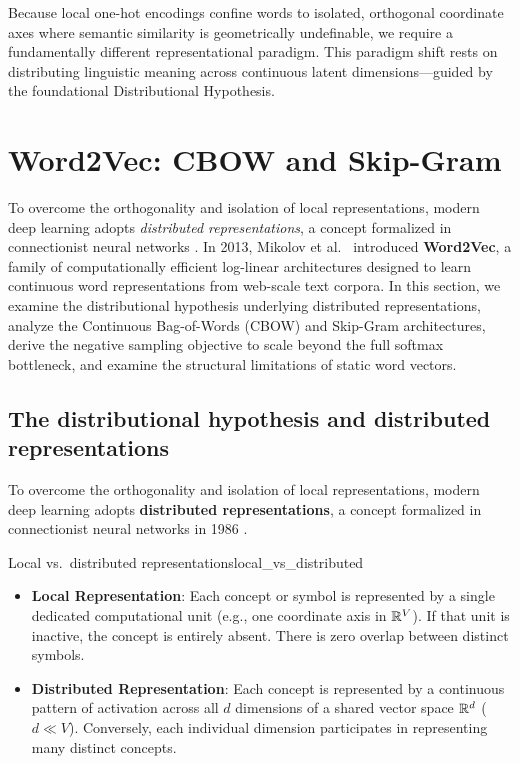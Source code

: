 \documentclass[../../main.tex]{subfiles}
\begin{document}
Because local one-hot encodings confine words to isolated, orthogonal coordinate axes where semantic similarity is geometrically undefinable, we require a fundamentally different representational paradigm. This paradigm shift rests on distributing linguistic meaning across continuous latent dimensions---guided by the foundational Distributional Hypothesis.

\clearpage

\clearpage
\section{Word2Vec: CBOW and Skip-Gram}
\label{sec:word2vec_cbow_skipgram}

To overcome the orthogonality and isolation of local representations, modern deep learning adopts \textit{distributed representations}, a concept formalized in connectionist neural networks \citep{rumelhart1986}. In 2013, Mikolov et al.~\citep{mikolov2013efficient,mikolov2013distributed} introduced \textbf{Word2Vec}, a family of computationally efficient log-linear architectures designed to learn continuous word representations from web-scale text corpora. In this section, we examine the distributional hypothesis underlying distributed representations, analyze the Continuous Bag-of-Words (CBOW) and Skip-Gram architectures, derive the negative sampling objective to scale beyond the full softmax bottleneck, and examine the structural limitations of static word vectors.

\subsection{The distributional hypothesis and distributed representations}
\label{subsec:distributional_hypothesis}


To overcome the orthogonality and isolation of local representations, modern deep learning adopts \textbf{distributed representations}, a concept formalized in connectionist neural networks in 1986 \cite{rumelhart1986}.

\begin{definition}{Local vs.~distributed representations}{local_vs_distributed}
\begin{itemize}
    \item \textbf{Local Representation}: Each concept or symbol is represented by a single dedicated computational unit (e.g., one coordinate axis in $\mathbb{R}^V$). If that unit is inactive, the concept is entirely absent. There is zero overlap between distinct symbols.
    \item \textbf{Distributed Representation}: Each concept is represented by a continuous pattern of activation across all $d$ dimensions of a shared vector space $\mathbb{R}^d$ ($d \ll V$). Conversely, each individual dimension participates in representing many distinct concepts.
\end{itemize}
\end{definition}
\end{document}
